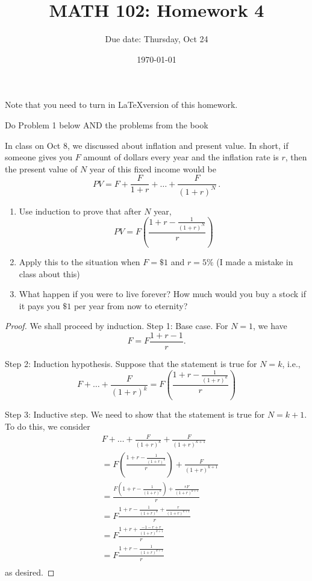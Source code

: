 \documentclass[12pt]{amsart}
\title{ MATH 102: Homework 4}
\author{Due date: Thursday, Oct 24}
\date{\today}
\begin{document}
\maketitle

Note that you need to turn in \LaTeX version of this homework.

Do Problem 1 below AND the problems from the book
\begin{problem}
In class on Oct 8, we discussed about inflation and present value.
In short, if someone gives you $F$ amount of dollars every year
and the inflation rate is $r$, then the present value of $N$ year
of this fixed income would be
\begin{equation*}
	PV = F + \frac{F}{1 + r} + \dots + \frac{F}{(1 + r)^N} \,.
\end{equation*}

\begin{enumerate}
	\item Use induction to prove that after $N$ year,
	      \begin{equation*}
		      PV = F \left(\frac{ 1 + r - \frac{1}{(1+r)^{N}} }{r} \right)
	      \end{equation*}
	\item Apply this to the situation when $F = \$1$ and $r = 5\%$ (I made a mistake in
	      class about this)
	\item What happen if you were to live forever? How much would you buy a stock if
	      it pays you $\$1$ per year from now to eternity?
\end{enumerate}

\begin{proof}
	We shall proceed by induction.
	Step 1: Base case. For $N =1$, we have
	$$ F = F \frac{ 1 + r - 1}{r}.$$

	Step 2: Induction hypothesis. Suppose that the statement is true for $N = k$, i.e.,
	$$ F + \dots + \frac{F}{(1+r)^k} = F\left( \frac{ 1 + r - \frac{1}{(1+r)^k}}{r} \right)$$

	Step 3: Inductive step. We need to show that the statement is true for $N = k+1$.
	To do this, we consider
	\begin{align*}
		 & F + \dots + \frac{F}{(1+r)^k} + \frac{F}{(1+r)^{k+1}}                          \\
		 & = F\left( \frac{ 1 + r - \frac{1}{(1+r)^k}}{r} \right) + \frac{F}{(1+r)^{k+1}} \\
		 & = \frac{ F\left(1 + r - \frac{1}{(1+r)^k} \right) + \frac{rF}{(1+r)^{k+1}}}{r} \\
		 & = F\frac{ 1 + r - \frac{1}{(1+r)^k}  + \frac{r}{(1+r)^{k+1}}}{r}               \\
		 & = F\frac{ 1 + r + \frac{-1-r + r}{(1+r)^{k+1}} }{r}                            \\
		 & = F\frac{ 1 + r - \frac{1}{(1+r)^{k+1}} }{r}                                   \\
	\end{align*}
	as desired.


\end{proof}
\end{problem}
\end{document}
